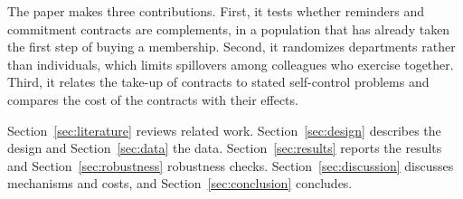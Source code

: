 The paper makes three contributions. First, it tests whether reminders and commitment contracts are complements, in a population that has already taken the first step of buying a membership. Second, it randomizes departments rather than individuals, which limits spillovers among colleagues who exercise together. Third, it relates the take-up of contracts to stated self-control problems and compares the cost of the contracts with their effects.

Section~\ref{sec:literature} reviews related work. Section~\ref{sec:design} describes the design and Section~\ref{sec:data} the data. Section~\ref{sec:results} reports the results and Section~\ref{sec:robustness} robustness checks. Section~\ref{sec:discussion} discusses mechanisms and costs, and Section~\ref{sec:conclusion} concludes.
